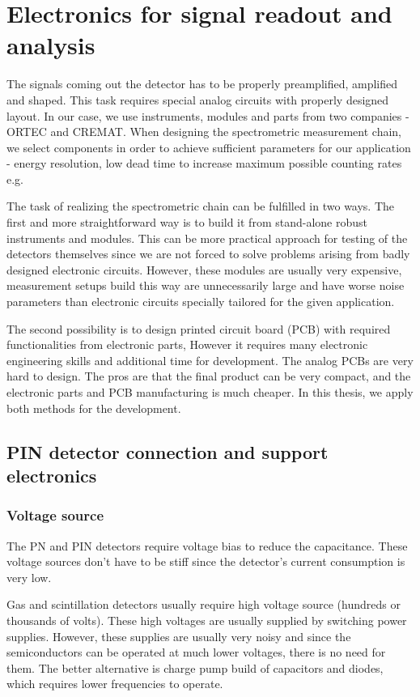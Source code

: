
\chapter{Electronics for signal readout and analysis}
The signals coming out the detector has to be properly preamplified, amplified and shaped. This  task requires special analog circuits with properly designed layout. 
In our case, we use instruments, modules and parts from two companies - ORTEC and CREMAT. When designing the spectrometric measurement chain, we select components in order to achieve sufficient parameters for our application - energy resolution, low dead time to increase maximum possible counting rates e.g. 
\par
The task of realizing the spectrometric chain can be fulfilled in two ways. The first and more straightforward way is to build it from stand-alone robust instruments and modules. This can be more practical approach for testing of the detectors themselves since we are not forced to solve problems arising from badly designed electronic circuits. However, these modules are usually very expensive, measurement setups build this way are unnecessarily large and have worse noise parameters than electronic circuits specially tailored for the given application.
\par
The second possibility is to design printed circuit board (PCB) with required functionalities from electronic parts, However it requires many electronic engineering skills and additional time for development. The analog PCBs are very hard to design. The pros are that the final product can be very compact, and the electronic parts and PCB manufacturing is much cheaper. In this thesis, we apply both methods for the development.



\section{PIN detector connection and support electronics}
\subsection{Voltage source}
The PN and PIN detectors require voltage bias to reduce the capacitance.
These voltage sources don't have to be stiff since the detector's current consumption is very low.
\par
Gas and scintillation detectors usually require high voltage source (hundreds or thousands of volts). These high voltages are usually supplied by switching power supplies.
However, these supplies are usually very noisy and since the semiconductors can be operated at much lower voltages, there is no need for them. The better alternative is charge pump build of capacitors and diodes, which requires lower frequencies to operate.
